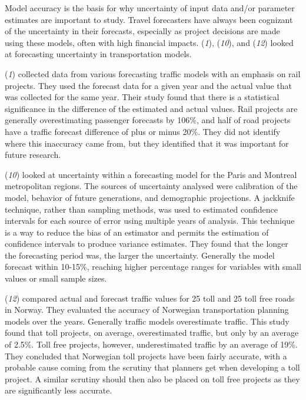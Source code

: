 \documentclass[
  letterpaper,
]{trb}
\begin{document}
Model accuracy is the basis for why uncertainty of input data and/or
parameter estimates are important to study. Travel forecasters have
always been cognizant of the uncertainty in their forecasts, especially
as project decisions are made using these models, often with high
financial impacts. (\emph{1}), (\emph{10}), and (\emph{12}) looked at
forecasting uncertainty in transportation models.

(\emph{1}) collected data from various forecasting traffic models with
an emphasis on rail projects. They used the forecast data for a given
year and the actual value that was collected for the same year. Their
study found that there is a statistical significance in the difference
of the estimated and actual values. Rail projects are generally
overestimating passenger forecasts by 106\%, and half of road projects
have a traffic forecast difference of plus or minus 20\%. They did not
identify where this inaccuracy came from, but they identified that it
was important for future research.

(\emph{10}) looked at uncertainty within a forecasting model for the
Paris and Montreal metropolitan regions. The sources of uncertainty
analysed were calibration of the model, behavior of future generations,
and demographic projections. A jackknife technique, rather than sampling
methods, was used to estimated confidence intervals for each source of
error using multiple years of analysis. This technique is a way to
reduce the bias of an estimator and permits the estimation of confidence
intervals to produce variance estimates. They found that the longer the
forecasting period was, the larger the uncertainty. Generally the model
forecast within 10-15\%, reaching higher percentage ranges for variables
with small values or small sample sizes.

(\emph{12}) compared actual and forecast traffic values for 25 toll and
25 toll free roads in Norway. They evaluated the accuracy of Norwegian
transportation planning models over the years. Generally traffic models
overestimate traffic. This study found that toll projects, on average,
overestimated traffic, but only by an average of 2.5\%. Toll free
projects, however, underestimated traffic by an average of 19\%. They
concluded that Norwegian toll projects have been fairly accurate, with a
probable cause coming from the scrutiny that planners get when
developing a toll project. A similar scrutiny should then also be placed
on toll free projects as they are significantly less accurate.
\end{document}
